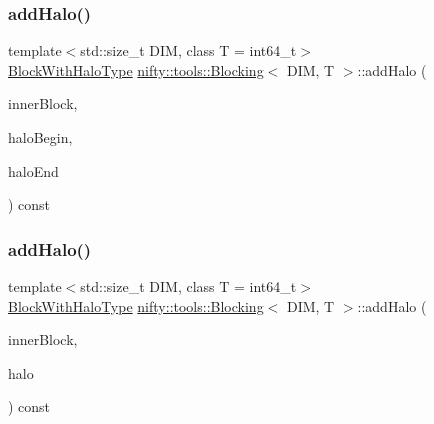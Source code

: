 \subsubsection{\texorpdfstring{add\+Halo()}{addHalo()}\hspace{0.1cm}{\footnotesize\ttfamily [1/2]}}
{\footnotesize\ttfamily template$<$std\+::size\+\_\+t D\+IM, class T  = int64\+\_\+t$>$ \\
\hyperlink{classnifty_1_1tools_1_1Blocking_abebd9361d89cc399bc495861fa4e331d}{Block\+With\+Halo\+Type} \hyperlink{classnifty_1_1tools_1_1Blocking}{nifty\+::tools\+::\+Blocking}$<$ D\+IM, T $>$\+::add\+Halo (\begin{DoxyParamCaption}\item[{const \hyperlink{classnifty_1_1tools_1_1Blocking_a597e0d4186d2d40ccb96698cc16775c6}{Block\+Type}}]{inner\+Block,  }\item[{const \hyperlink{classnifty_1_1tools_1_1Blocking_a5f8df3d4cdf09803217d729a04018fb3}{Vector\+Type} \&}]{halo\+Begin,  }\item[{const \hyperlink{classnifty_1_1tools_1_1Blocking_a5f8df3d4cdf09803217d729a04018fb3}{Vector\+Type} \&}]{halo\+End }\end{DoxyParamCaption}) const\hspace{0.3cm}{\ttfamily [inline]}}

\mbox{\label{classnifty_1_1tools_1_1Blocking_a735ce675927a0a76cf9370c40022e8de}} 
\subsubsection{\texorpdfstring{add\+Halo()}{addHalo()}\hspace{0.1cm}{\footnotesize\ttfamily [2/2]}}
{\footnotesize\ttfamily template$<$std\+::size\+\_\+t D\+IM, class T  = int64\+\_\+t$>$ \\
\hyperlink{classnifty_1_1tools_1_1Blocking_abebd9361d89cc399bc495861fa4e331d}{Block\+With\+Halo\+Type} \hyperlink{classnifty_1_1tools_1_1Blocking}{nifty\+::tools\+::\+Blocking}$<$ D\+IM, T $>$\+::add\+Halo (\begin{DoxyParamCaption}\item[{const \hyperlink{classnifty_1_1tools_1_1Blocking_a597e0d4186d2d40ccb96698cc16775c6}{Block\+Type}}]{inner\+Block,  }\item[{const \hyperlink{classnifty_1_1tools_1_1Blocking_a5f8df3d4cdf09803217d729a04018fb3}{Vector\+Type} \&}]{halo }\end{DoxyParamCaption}) const\hspace{0.3cm}{\ttfamily [inline]}}

